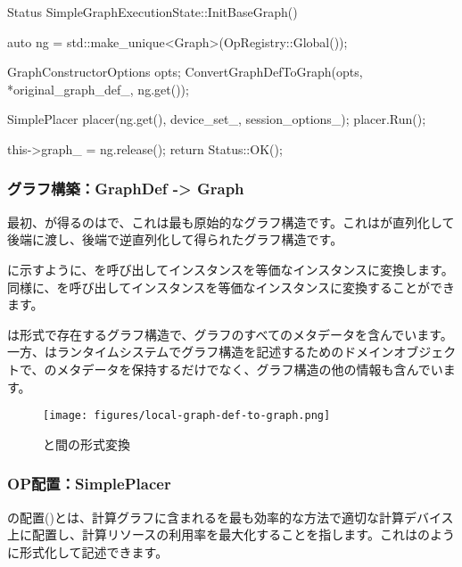 \begin{content}
\begin{leftbar}
\begin{c++}
Status SimpleGraphExecutionState::InitBaseGraph() {
  auto ng = std::make_unique<Graph>(OpRegistry::Global());

  GraphConstructorOptions opts;
  ConvertGraphDefToGraph(opts, *original_graph_def_, ng.get());

  SimplePlacer placer(ng.get(), device_set_, session_options_);
  placer.Run();

  this->graph_ = ng.release();
  return Status::OK();
}
\end{c++}
\end{leftbar}

\subsubsection{グラフ構築：GraphDef -> Graph}

最初、が得るのはで、これは最も原始的なグラフ構造です。これはが直列化して後端に渡し、後端で逆直列化して得られたグラフ構造です。

に示すように、を呼び出してインスタンスを等価なインスタンスに変換します。同様に、を呼び出してインスタンスを等価なインスタンスに変換することができます。

は形式で存在するグラフ構造で、グラフのすべてのメタデータを含んでいます。一方、はランタイムシステムでグラフ構造を記述するためのドメインオブジェクトで、のメタデータを保持するだけでなく、グラフ構造の他の情報も含んでいます。

\begin{figure}[H]
\centering
\texttt{[image: figures/local-graph-def-to-graph.png]}
\caption{と間の形式変換}
 \label{fig:local-graph-def-to-graph}
\end{figure}

\subsubsection{OP配置：SimplePlacer}

の配置()とは、計算グラフに含まれるを最も効率的な方法で適切な計算デバイス上に配置し、計算リソースの利用率を最大化することを指します。これはのように形式化して記述できます。


\end{content}

